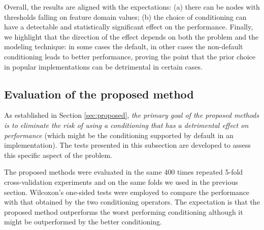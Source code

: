 \documentclass[sn-mathphys]{sn-jnl}%
\theoremstyle{thmstyleone}%
\theoremstyle{thmstyletwo}%
\theoremstyle{thmstylethree}%
\begin{document}
Overall, the results are aligned with the expectations: (a) there can be nodes with thresholds falling on feature domain values; (b) the choice of conditioning can have a detectable and statistically significant effect on the performance. Finally, we highlight that the direction of the effect depends on both the problem and the modeling technique: in some cases the default, in other cases the non-default conditioning leads to better performance, proving the point that the prior choice in popular implementations can be detrimental in certain cases.


\subsection{Evaluation of the proposed method}
\label{sec:tests-proposed}

As established in Section \ref{sec:proposed}, \emph{the primary goal of the proposed methods is to eliminate the risk of using a conditioning that has a detrimental effect on performance} (which might be the conditioning supported by default in an implementation). The tests presented in this subsection are developed to assess this specific aspect of the problem.

\begin{table}
  \caption{The results of the evaluation. The columns $p_{\neq}$ are identical to those in Table \ref{tab:proof}, indicating if statistical evidence was found against the equivalence of the two conditionings. The columns $p_{\leq}$ (or $p_{<}$) indicate if the proposed method stochastically dominates (+) or minorizes (-) the use of the conditioning operator $\leq$ (or $<$) with statistical significance. The columns $auc_d$ and $r^2_d$ contain the difference in the mean performance score of the proposed method and that of the worst performing conditioning, indicating the improvement over the worst case. To reduce clutter, we did not populate the cells where the proposed method cannot be distinguished with statistical significance from any of the individual conditionings.}
  \label{tab:results}
  \begin{center}
    \begin{footnotesize}
      
    \end{footnotesize}
  \end{center}
\end{table}

The proposed methods were evaluated in the same 400 times repeated 5-fold cross-validation experiments and on the same folds we used in the previous section. Wilcoxon's one-sided tests were employed to compare the performance with that obtained by the two conditioning operators. The expectation is that the proposed method outperforms the worst performing conditioning although it might be outperformed by the better conditioning. 
\end{document}

